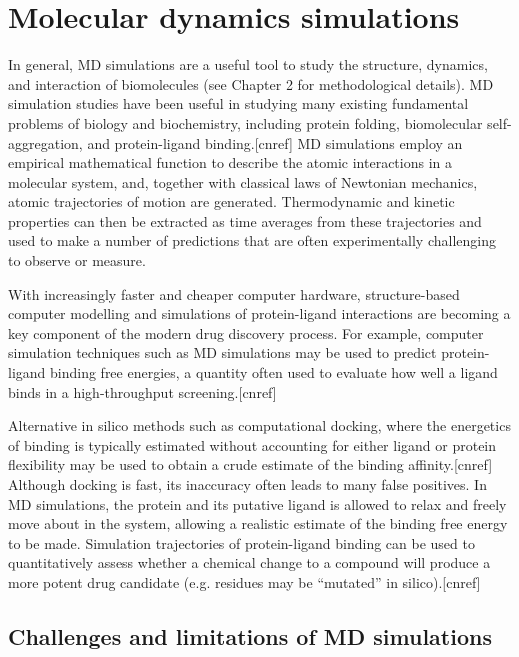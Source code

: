 \section{Molecular dynamics simulations}
In general, MD simulations are a useful tool to study the structure, dynamics, and interaction of biomolecules (see Chapter 2 for methodological details).  MD simulation studies have been useful in studying many existing fundamental problems of biology and biochemistry, including protein folding, biomolecular self-aggregation, and protein-ligand binding.[cnref]  MD simulations employ an empirical mathematical function to describe the atomic interactions in a molecular system, and, together with classical laws of Newtonian mechanics, atomic trajectories of motion are generated.  Thermodynamic and kinetic properties can then be extracted as time averages from these trajectories and used to make a number of predictions that are often experimentally challenging to observe or measure.  

With increasingly faster and cheaper computer hardware, structure-based computer modelling and simulations of protein-ligand interactions are becoming a key component of the modern drug discovery process. For example, computer simulation techniques such as MD simulations may be used to predict protein-ligand binding free energies,  a quantity often used to evaluate how well a ligand binds in a high-throughput screening.[cnref]

Alternative in silico methods such as computational docking, where the energetics of binding is typically estimated without accounting for either ligand or protein flexibility may be used to obtain a crude estimate of the binding affinity.[cnref]  Although docking is fast, its inaccuracy often leads to many false positives. In MD simulations, the protein and its putative ligand is allowed to relax and freely move about in the system, allowing a realistic estimate of the binding free energy to be made. Simulation trajectories of protein-ligand binding can be used to quantitatively assess whether a chemical change to a compound will produce a more potent drug candidate (e.g.  residues may be ``mutated'' in silico).[cnref]


\subsection{Challenges and limitations of MD simulations}

